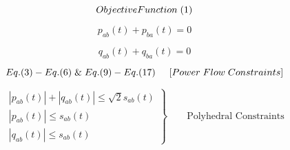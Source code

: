 \begin{tcolorbox}[colback=gray!5!white,colframe=gray!25!black,title=Feasible Set 3 (Network Flow):]
\[
Objective Function\hspace{0.1cm}(1)
\]

\[
  p_{ab}(t) + p_{ba}(t)= 0 
\]

\[
  q_{ab}(t) + q_{ba}(t)= 0 
\]

\[
Eq.(3) - Eq.(6)\hspace{0.1cm} \&\hspace{0.1cm} Eq.(9) - Eq.(17) \hspace{0.5cm} [Power \hspace{0.1cm} Flow \hspace{0.1cm}  Constraints] 
\]

\[
 \left.\begin{aligned}
        |p_{ab}(t)| + |q_{ab}(t)|\leq \sqrt{2}s_{ab}(t)\\
        |p_{ab}(t)|\leq s_{ab}(t)\\
        |q_{ab}(t)|\leq s_{ab}(t)
       \end{aligned}
 \right\}
 \qquad \text{Polyhedral Constraints}
\]

\end{tcolorbox}
